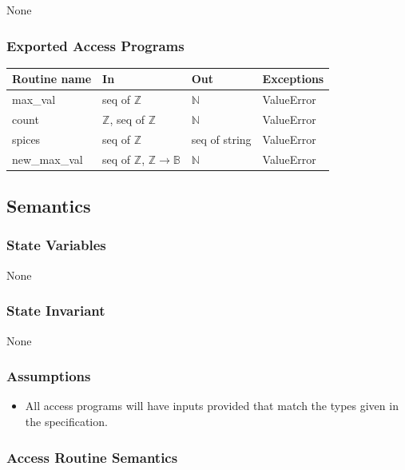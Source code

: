 \documentclass[12pt,fleqn]{examtst}
\begin{document}
None 

\subsubsection* {Exported Access Programs}

\begin{tabular}{| l | l | l | p{5cm} |}
\hline
\textbf{Routine name} & \textbf{In} & \textbf{Out} & \textbf{Exceptions}\\
\hline
max\_val & seq of $\mathbb{Z}$ & $\mathbb{N}$ & ValueError\\
  \hline
count & $\mathbb{Z}$, seq of $\mathbb{Z}$ & $\mathbb{N}$ & ValueError\\
\hline
spices & seq of $\mathbb{Z}$ & seq of string & ValueError\\
\hline
new\_max\_val & seq of $\mathbb{Z}$, $\mathbb{Z} \rightarrow \mathbb{B}$ &
                                                                           $\mathbb{N}$ & ValueError\\
\hline
  
\end{tabular}

\subsection* {Semantics}

\subsubsection* {State Variables}

None

\subsubsection* {State Invariant}

None

\subsubsection* {Assumptions}

\begin{itemize}
\item All access programs will have inputs provided that match the types
  given in the specification.
\end{itemize}

\subsubsection* {Access Routine Semantics}
\end{document}
